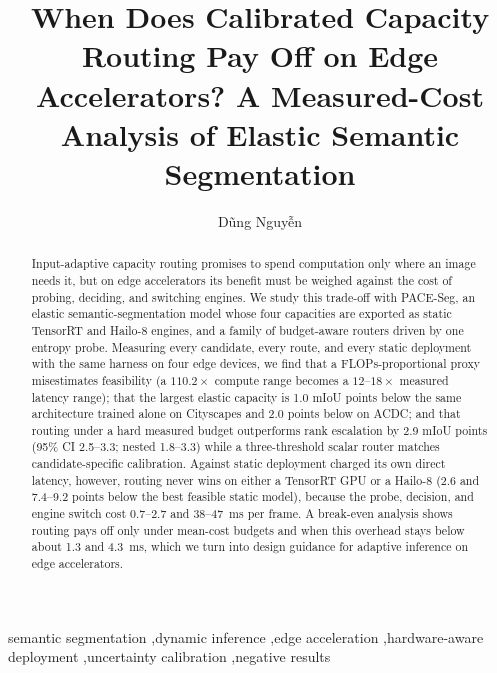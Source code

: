 \documentclass[a4paper,5p]{elsarticle}
\newcommand{\method}{PACE-Seg}
\newcommand{\miou}{mIoU}
\begin{document}
\begin{frontmatter}

\title{When Does Calibrated Capacity Routing Pay Off on Edge Accelerators? A Measured-Cost Analysis of Elastic Semantic Segmentation}

\author[aff1]{Dũng Nguyễn}

\begin{abstract}
Input-adaptive capacity routing promises to spend computation only where an image needs it, but on edge accelerators its benefit must be weighed against the cost of probing, deciding, and switching engines. We study this trade-off with \method{}, an elastic semantic-segmentation model whose four capacities are exported as static TensorRT and Hailo-8 engines, and a family of budget-aware routers driven by one entropy probe. Measuring every candidate, every route, and every static deployment with the same harness on four edge devices, we find that a FLOPs-proportional proxy misestimates feasibility (a $110.2\times$ compute range becomes a $12$--$18\times$ measured latency range); that the largest elastic capacity is 1.0 \miou{} points below the same architecture trained alone on Cityscapes and 2.0 points below on ACDC; and that routing under a hard measured budget outperforms rank escalation by 2.9 \miou{} points (95\% CI 2.5--3.3; nested 1.8--3.3) while a three-threshold scalar router matches candidate-specific calibration. Against static deployment charged its own direct latency, however, routing never wins on either a TensorRT GPU or a Hailo-8 (2.6 and 7.4--9.2 points below the best feasible static model), because the probe, decision, and engine switch cost 0.7--2.7 and 38--47~ms per frame. A break-even analysis shows routing pays off only under mean-cost budgets and when this overhead stays below about 1.3 and 4.3~ms, which we turn into design guidance for adaptive inference on edge accelerators.
\end{abstract}

\begin{keyword}
semantic segmentation \sep dynamic inference \sep edge acceleration \sep hardware-aware deployment \sep uncertainty calibration \sep negative results
\end{keyword}

\end{frontmatter}
\end{document}
